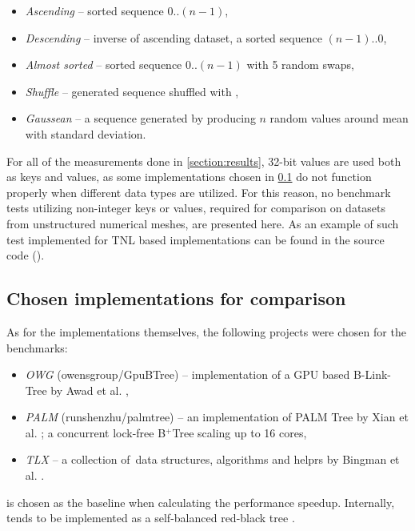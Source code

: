 \begin{itemize}
  \item \textit{Ascending} -- sorted sequence $0..(n-1)$,
  \item \textit{Descending} -- inverse of ascending dataset, a sorted sequence $(n-1)..0$,
  \item \textit{Almost sorted} -- sorted sequence $0..(n-1)$ with 5 random swaps,
  \item \textit{Shuffle} -- generated sequence shuffled with ,
  \item \textit{Gaussean} -- a sequence generated by producing $n$ random values around mean with standard deviation.
\end{itemize}

For all of the measurements done in \cref{section:results}, 32-bit values are used both as keys and values, as some implementations chosen in \cref{subsection:benchmark:implementations} do not function properly when different data types are utilized. For this reason, no benchmark tests utilizing non-integer keys or values, required for comparison on datasets from unstructured numerical meshes, are presented here. As an example of such test implemented for TNL based implementations can be found in the source code ().

\subsection{Chosen implementations for comparison}\label{subsection:benchmark:implementations}

As for the implementations themselves, the following projects were chosen for the benchmarks:

\begin{itemize}
  \item \textit{OWG} (owensgroup/GpuBTree) -- implementation of a GPU based B-Link-Tree by Awad et al. \cite{awad},
  \item \textit{PALM} (runshenzhu/palmtree) -- an implementation of PALM Tree \cite{palm} by Xian et al. \cite{palm-impl}; a concurrent lock-free B$^+$Tree scaling up to 16 cores,
  \item \textit{TLX} -- a collection of \CC\,data structures, algorithms and helprs by Bingman et al. \cite{TLX}.
\end{itemize}

 is chosen as the baseline when calculating the performance speedup. Internally,  tends to be implemented as a self-balanced red-black tree \cite{cppreference-map}.

